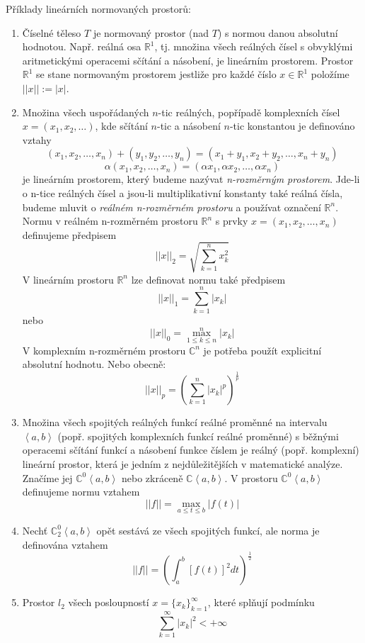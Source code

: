 \documentclass[a4paper, 11pt]{report}
\begin{document}
Příklady lineárních normovaných prostorů:
\begin{enumerate}
	\item Číselné těleso $T$ je normovaný prostor (nad $T$) s normou danou absolutní hodnotou. Např. reálná osa $\mathbb{R}^1$, tj. množina všech reálných čísel s obvyklými aritmetickými operacemi sčítání a násobení, je lineárním prostorem. Prostor $\mathbb{R}^1$ se stane normovaným prostorem jestliže pro každé číslo $x \in \mathbb{R}^1$ položíme $||x|| := |x|$.
	\item Množina všech uspořádaných $n$-tic reálných, popřípadě komplexních čísel $x = (x_1, x_2, \dots)$, kde sčítání $n$-tic a násobení $n$-tic konstantou je definováno vztahy
	$$(x_1, x_2, \dots, x_n) + (y_1, y_2, \dots, y_n) = (x_1 + y_1, x_2 + y_2, \dots, x_n + y_n) $$
	$$\alpha (x_1, x_2, \dots, x_n) = (\alpha x_1, \alpha x_2, \dots, \alpha x_n) $$
	je lineárním prostorem, který budeme nazývat \emph{n-rozměrným prostorem}. Jde-li o n-tice reálných čísel a jsou-li multiplikativní konstanty také reálná čísla, budeme mluvit o \emph{reálném n-rozměrném prostoru} a používat označení $\mathbb{R}^n$.
	Normu v reálném n-rozměrném prostoru $\mathbb{R}^n$ s prvky $x = (x_1, x_2, \dots, x_n) $ definujeme předpisem
	$$||x||_2 = \sqrt{\sum\limits_{k = 1}^n x_k^2}$$
	V lineárním prostoru $\mathbb{R}^n$ lze definovat normu také předpisem
	$$||x||_1 = \sum\limits_{k = 1}^n |x_k|$$
	nebo
	$$||x||_0 = \max\limits_{1 \leq k \leq n}^n |x_k|$$
	V komplexním n-rozměrném prostoru $\mathbb{C}^n$ je potřeba  použít explicitní absolutní hodnotu. Nebo obecně:
	$$||x||_p = \left( \sum\limits_{k = 1}^n |x_k|^p \right)^\frac{1}{p}$$
	\item Množina všech spojitých reálných funkcí reálné proměnné na intervalu $\left<a, b\right>$ (popř. spojitých komplexních funkcí reálné proměnné) s běžnými operacemi sčítání funkcí a násobení funkce číslem je reálný (popř. komplexní) lineární prostor, která je jedním z nejdůležitějších v matematické analýze. Značíme jej $\mathbb{C}^0\left<a,b\right>$ nebo zkráceně $\mathbb{C}\left<a,b\right>$. V prostoru $\mathbb{C}^0\left<a,b\right>$ definujeme normu vztahem
	$$||f|| = \max\limits_{a \leq t \leq b} |f(t)|$$
	\item Nechť $\mathbb{C}_2^0\left<a,b\right>$ opět sestává ze všech spojitých funkcí, ale norma je definována vztahem
	$$||f|| = \left( \int_a^b [f(t)]^2 dt \right)^\frac{1}{2}$$
	\item Prostor $l_2$ všech posloupností $x = \{x_k\}_{k=1}^\infty$, které splňují podmínku
	$$\sum\limits_{k=1}^\infty |x_k|^2 < + \infty$$

\end{enumerate}
\end{document}
